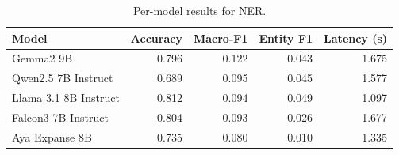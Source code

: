 \begin{table}[t]
\centering
\caption{Per-model results for NER.}
\label{tab:appendix-ner-analysis}
\begin{tabular}{lrrrr}
\toprule
Model & Accuracy & Macro-F1 & Entity F1 & Latency (s) \\
\midrule
Gemma2 9B & 0.796 & 0.122 & 0.043 & 1.675 \\
Qwen2.5 7B Instruct & 0.689 & 0.095 & 0.045 & 1.577 \\
Llama 3.1 8B Instruct & 0.812 & 0.094 & 0.049 & 1.097 \\
Falcon3 7B Instruct & 0.804 & 0.093 & 0.026 & 1.677 \\
Aya Expanse 8B & 0.735 & 0.080 & 0.010 & 1.335 \\
\bottomrule
\end{tabular}
\end{table}
